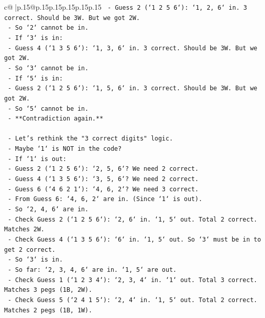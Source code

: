 \documentclass{article}
\begin{document}
{\begin{supertabular}{c@{$\;$}|p{.15\linewidth}@{}p{.15\linewidth}p{.15\linewidth}p{.15\linewidth}p{.15\linewidth}p{.15\linewidth}}
{{{\texttt{                            {-} Guess 2 (`1 2 5 6`): `1, 2, 6` in. 3 correct. Should be 3W. But we got 2W.} \\
\texttt{                            {-} So `2` cannot be in.} \\
\texttt{                        {-} If `3` is in:} \\
\texttt{                            {-} Guess 4 (`1 3 5 6`): `1, 3, 6` in. 3 correct. Should be 3W. But we got 2W.} \\
\texttt{                            {-} So `3` cannot be in.} \\
\texttt{                        {-} If `5` is in:} \\
\texttt{                            {-} Guess 2 (`1 2 5 6`): `1, 5, 6` in. 3 correct. Should be 3W. But we got 2W.} \\
\texttt{                            {-} So `5` cannot be in.} \\
\texttt{                        {-} **Contradiction again.**} \\
\\ 
\texttt{    {-} Let's rethink the "3 correct digits" logic.} \\
\texttt{    {-} Maybe `1` is NOT in the code?} \\
\texttt{    {-} If `1` is out:} \\
\texttt{        {-} Guess 2 (`1 2 5 6`): `2, 5, 6`? We need 2 correct.} \\
\texttt{        {-} Guess 4 (`1 3 5 6`): `3, 5, 6`? We need 2 correct.} \\
\texttt{        {-} Guess 6 (`4 6 2 1`): `4, 6, 2`? We need 3 correct.} \\
\texttt{        {-} From Guess 6: `4, 6, 2` are in. (Since `1` is out).} \\
\texttt{        {-} So `2, 4, 6` are in.} \\
\texttt{        {-} Check Guess 2 (`1 2 5 6`): `2, 6` in. `1, 5` out. Total 2 correct. Matches 2W.} \\
\texttt{        {-} Check Guess 4 (`1 3 5 6`): `6` in. `1, 5` out. So `3` must be in to get 2 correct.} \\
\texttt{        {-} So `3` is in.} \\
\texttt{        {-} So far: `2, 3, 4, 6` are in. `1, 5` are out.} \\
\texttt{        {-} Check Guess 1 (`1 2 3 4`): `2, 3, 4` in. `1` out. Total 3 correct. Matches 3 pegs (1B, 2W).} \\
\texttt{        {-} Check Guess 5 (`2 4 1 5`): `2, 4` in. `1, 5` out. Total 2 correct. Matches 2 pegs (1B, 1W).} \\
}}}
\end{supertabular}}
\end{document}
